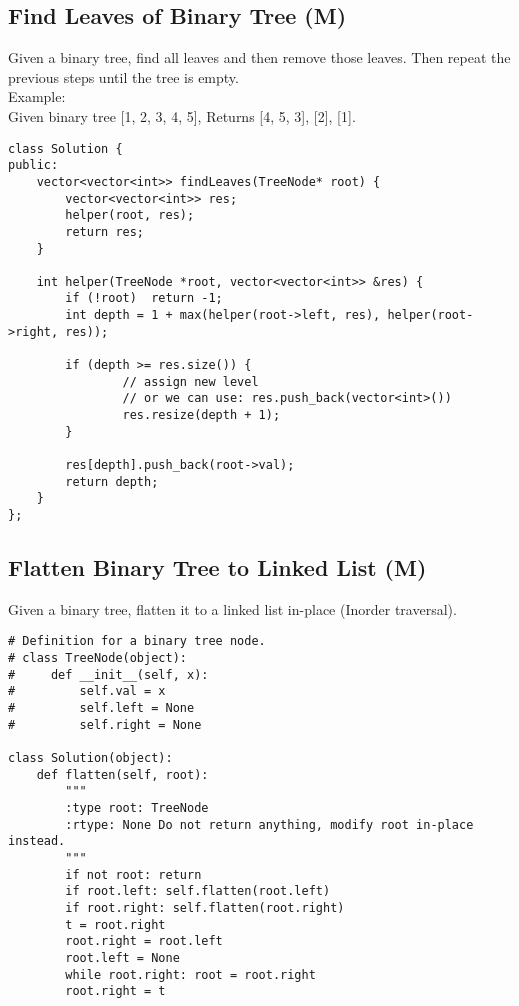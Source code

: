\subsection{Find Leaves of Binary Tree (M)}
Given a binary tree, find all leaves and then remove those leaves. Then repeat the previous steps until the tree is empty.\\

Example:\\
Given binary tree [1, 2, 3, 4, 5], Returns [4, 5, 3], [2], [1].\\

\begin{lstlisting}
class Solution {
public:
    vector<vector<int>> findLeaves(TreeNode* root) {
        vector<vector<int>> res;
        helper(root, res);
        return res;
    }
    
    int helper(TreeNode *root, vector<vector<int>> &res) {
        if (!root)  return -1;
        int depth = 1 + max(helper(root->left, res), helper(root->right, res));
        
        if (depth >= res.size()) {
                // assign new level
                // or we can use: res.push_back(vector<int>())
        		res.resize(depth + 1);
        }
        
        res[depth].push_back(root->val);
        return depth;
    }
};
\end{lstlisting}

\subsection{Flatten Binary Tree to Linked List (M)}
Given a binary tree, flatten it to a linked list in-place (Inorder traversal). \\

\begin{lstlisting}
# Definition for a binary tree node.
# class TreeNode(object):
#     def __init__(self, x):
#         self.val = x
#         self.left = None
#         self.right = None

class Solution(object):
    def flatten(self, root):
        """
        :type root: TreeNode
        :rtype: None Do not return anything, modify root in-place instead.
        """
        if not root: return
        if root.left: self.flatten(root.left)
        if root.right: self.flatten(root.right)
        t = root.right
        root.right = root.left
        root.left = None
        while root.right: root = root.right
        root.right = t
\end{lstlisting}

